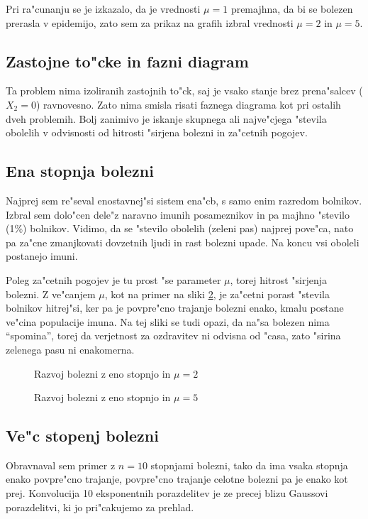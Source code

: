 \documentclass[a4paper,10pt]{article}
\begin{document}
Pri ra"cunanju se je izkazalo, da je vrednosti $\mu=1$ premajhna, da bi se bolezen prerasla v epidemijo, zato sem za prikaz na grafih izbral vrednosti $\mu=2$ in $\mu=5$. 

\subsection{Zastojne to"cke in fazni diagram}
Ta problem nima izoliranih zastojnih to"ck, saj je vsako stanje brez prena"salcev ($X_2=0$) ravnovesno. Zato nima smisla risati faznega diagrama kot pri ostalih dveh problemih. Bolj zanimivo je iskanje skupnega ali najve"cjega "stevila obolelih v odvisnosti od hitrosti "sirjena bolezni in za"cetnih pogojev. 

\subsection{Ena stopnja bolezni}

Najprej sem re"seval enostavnej"si sistem ena"cb, s samo enim razredom bolnikov. Izbral sem dolo"cen dele"z naravno imunih posameznikov in pa majhno "stevilo (1\%) bolnikov. Vidimo, da se "stevilo obolelih (zeleni pas) najprej pove"ca, nato pa za"cne zmanjkovati dovzetnih ljudi in rast bolezni upade. Na koncu vsi oboleli postanejo imuni. 

Poleg za"cetnih pogojev je tu prost "se parameter $\mu$, torej hitrost "sirjenja bolezni. Z ve"canjem $\mu$, kot na primer na sliki \ref{fig:b-1-2}, je za"cetni porast "stevila bolnikov hitrej"si, ker pa je povpre"cno trajanje bolezni enako, kmalu postane ve"cina populacije imuna. Na tej sliki se tudi opazi, da na"sa bolezen nima ``spomina'', torej da verjetnost za ozdravitev ni odvisna od "casa, zato "sirina zelenega pasu ni enakomerna. 

\begin{figure}[!h]
  
  \caption{Razvoj bolezni z eno stopnjo in $\mu=2$}
  \label{fig:b-1-1}
\end{figure}

\begin{figure}[!h]
  
  \caption{Razvoj bolezni z eno stopnjo in $\mu=5$}
  \label{fig:b-1-2}
\end{figure}

\clearpage

\subsection{Ve"c stopenj bolezni}
Obravnaval sem primer z $n=10$ stopnjami bolezni, tako da ima vsaka stopnja enako povpre"cno trajanje, povpre"cno trajanje celotne bolezni pa je enako kot prej. Konvolucija 10 eksponentnih porazdelitev je ze precej blizu Gaussovi porazdelitvi, ki jo pri"cakujemo za prehlad. 
\end{document}
